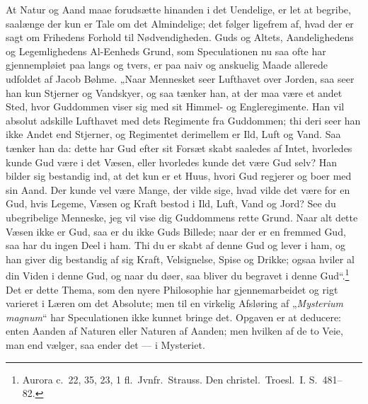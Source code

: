 \documentclass[12pt]{book}
\begin{document}
At Natur og Aand maae forudsætte hinanden i det Uendelige, er let at
begribe, saalænge der kun er Tale om det Almindelige; det følger
ligefrem af, hvad der er sagt om Frihedens Forhold til
Nødvendigheden. Guds og Altets, Aandelighedens og Legemlighedens
Al-Eenheds Grund, som Speculationen nu saa ofte har gjennempløiet
paa langs og tvers, er paa naiv og anskuelig Maade allerede udfoldet
af Jacob Bøhme. „Naar Mennesket seer Lufthavet over Jorden, saa seer
han kun Stjerner og Vandskyer, og saa tænker han, at der maa være et
andet Sted, hvor Guddommen viser sig med sit Himmel- og
Engleregimente. Han vil absolut adskille Lufthavet med dets
Regimente fra Guddommen; thi deri seer han ikke Andet end Stjerner,
og Regimentet derimellem er Ild, Luft og Vand. Saa tænker han da:
dette har Gud efter sit Forsæt skabt saaledes af Intet, hvorledes
kunde Gud
være i det Væsen, eller hvorledes kunde det være Gud selv? Han
bilder sig bestandig ind, at det kun er et Huus, hvori Gud regjerer
og boer med sin Aand. Der kunde vel være Mange, der vilde sige, hvad
vilde det være for en Gud, hvis Legeme, Væsen og Kraft bestod i
Ild, Luft, Vand og Jord? See du ubegribelige Menneske, jeg vil vise
dig Guddommens rette Grund. Naar alt dette Væsen ikke er Gud, saa er
du ikke Guds Billede; naar der er en fremmed Gud, saa har du ingen
Deel i ham. Thi du er skabt af denne Gud og lever i ham, og han
giver dig bestandig af sig Kraft, Velsignelse, Spise og Drikke;
ogsaa hviler al din Viden i denne Gud, og naar du døer, saa bliver
du begravet i denne Gud“.\footnote{Aurora c.\ 22, 35, 23, 1 fl.\
Jvnfr.\ Strauss. Den christel.\ Troesl.\ I. S.\ 481--82.} Det er
dette Thema, som den nyere Philosophie har gjennemarbeidet og rigt
varieret i Læren om det Absolute; men til en virkelig Afsløring af
„\textit{Mysterium magnum}“ har Speculationen ikke kunnet bringe
det. Opgaven er at deducere: enten Aanden af Naturen eller Naturen
af Aanden; men hvilken af de to Veie, man end vælger, saa ender det
--- i Mysteriet.
\end{document}
